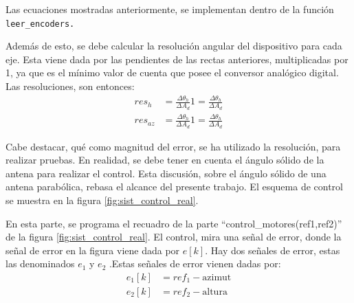Las ecuaciones mostradas anteriormente, se implementan dentro de la función \texttt{leer_encoders.} 

Además de esto, se debe calcular la resolución angular del dispositivo para cada eje. Esta viene dada por las pendientes de las rectas anteriores, multiplicadas por 1, ya que es el mínimo valor de cuenta que posee el conversor analógico digital. Las resoluciones, son entonces: 
\begin{equation}
	\begin{split}
		res_h &= \frac{ \Delta\theta_h}{\Delta A_d}  1 = \frac{ \Delta\theta_h}{\Delta A_d} \\  
		res_{az} &= \frac{ \Delta\theta_h}{\Delta A_d}  1 = \frac{ \Delta\theta_h}{\Delta A_d}   	
	\end{split}
\end{equation}

Cabe destacar, qué como magnitud del error, se ha utilizado la resolución, para realizar pruebas. En realidad, se debe tener en cuenta el ángulo sólido de la antena para realizar el control. Esta discusión, sobre el ángulo sólido de una antena parabólica, rebasa el alcance del presente trabajo.
El esquema de control se muestra en la figura  \ref{fig:sist_control_real}. 

En esta parte, se programa el recuadro de la parte ``control\_motores(ref1,ref2)'' de la figura \ref{fig:sist_control_real}. El control, mira una señal de error, donde la señal de error en la figura viene dada por $e[k]$. Hay dos señales de error, estas las denominados $e_1 $ y $e_2$ .Estas señales de error vienen dadas por: 
\begin{equation}
	\begin{split}
		e_1[k]&=ref_1 - \text{azimut}  \\
	    e_2[k]&=ref_2 - \text{altura}  
	\end{split}
\end{equation}

